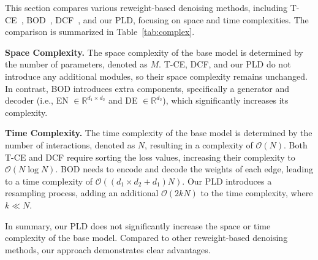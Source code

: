 


This section compares various reweight-based denoising methods, including T-CE~\cite{wang2021denoising}, BOD~\cite{wang2023efficient}, DCF~\cite{he2024double}, and our PLD, focusing on space and time complexities. The comparison is summarized in Table~\ref{tab:complex}.

\textbf{Space Complexity.}
The space complexity of the base model is determined by the number of parameters, denoted as \(M\). T-CE, DCF, and our PLD do not introduce any additional modules, so their space complexity remains unchanged. In contrast, BOD introduces extra components, specifically a generator and decoder (i.e., EN \(\in \mathbb{R}^{d_1 \times d_2}\) and DE \(\in \mathbb{R}^{d_2}\)), which significantly increases its complexity.

\textbf{Time Complexity.}
The time complexity of the base model is determined by the number of interactions, denoted as \(N\), resulting in a complexity of \(\mathcal{O}(N)\). Both T-CE and DCF require sorting the loss values, increasing their complexity to \(\mathcal{O}(N \log N)\). BOD needs to encode and decode the weights of each edge, leading to a time complexity of \(\mathcal{O}((d_1 \times d_2 + d_1)N)\). Our PLD introduces a resampling process, adding an additional \(\mathcal{O}(2kN)\) to the time complexity, where \(k \ll N\).

In summary, our PLD does not significantly increase the space or time complexity of the base model. Compared to other reweight-based denoising methods, our approach demonstrates clear advantages.

